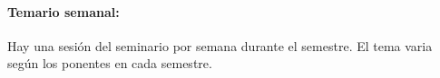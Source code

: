 \paragraph{Temario semanal:}

\quad

Hay una sesi\'{o}n del seminario por semana durante el semestre. El
tema varia según los ponentes en cada semestre.
